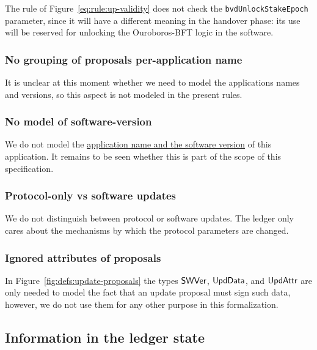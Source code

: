 The rule of Figure~\ref{eq:rule:up-validity} does not check the
\lstinline{bvdUnlockStakeEpoch} parameter, since it will have a different
meaning in the handover phase: its use will be reserved for unlocking the
Ouroboros-BFT logic in the software.

\subsubsection{No grouping of proposals per-application name}
\label{sec:no-app-up-grouping}

It is unclear at this moment whether we need to model the applications names
and versions, so this aspect is not modeled in the present rules.

\subsubsection{No model of software-version}
\label{sec:no-model-software-version}

We do not model the
\href{https://github.com/input-output-hk/cardano-sl/blob/develop/docs/block-processing/us.md#software-version}{application
  name and the software version} of this application. It remains to be seen
whether this is part of the scope of this specification.


\subsubsection{Protocol-only vs software updates}
\label{sec:protocol-vs-software-updates}

We do not distinguish between protocol or software updates. The ledger only
cares about the mechanisms by which the protocol parameters are changed.

\subsubsection{Ignored attributes of proposals}

In Figure~\ref{fig:defs:update-proposals} the types $\mathsf{SWVer}$,
$\mathsf{UpdData}$, and $\mathsf{UpdAttr}$ are only needed to model the fact that
an update proposal must sign such data, however, we do not use them for any
other purpose in this formalization.

\subsection{Information in the ledger state}
\label{sec:information-in-ledger-state}

